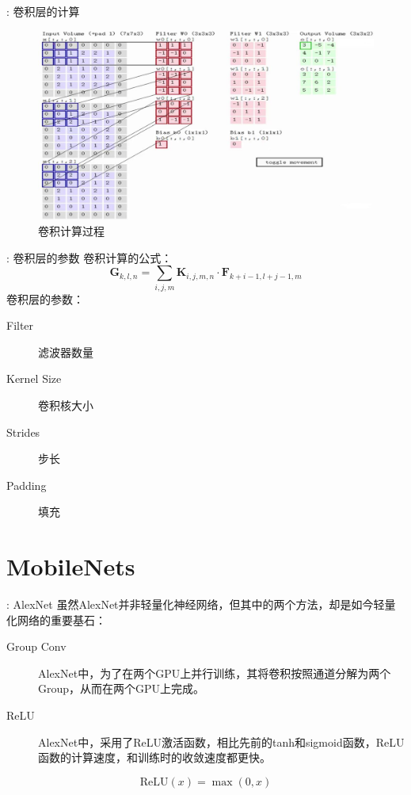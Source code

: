 \documentclass[UTF8, fontset=founder, aspectratio=43, 10pt, t]{ctexbeamer}
\begin{document}
\begin{frame}{\titleprefix: 卷积层的计算}
	\begin{figure}
		\centering
		\includegraphics[width=\linewidth]{Images/conv_1}
		\caption{卷积计算过程}
		\label{fig:conv1}
	\end{figure}
	
\end{frame}

\begin{frame}{\titleprefix: 卷积层的参数}
	卷积计算的公式：
	\[
	\mathbf{G}_{k, l, n}=\sum_{i, j, m} \mathbf{K}_{i, j, m, n} \cdot \mathbf{F}_{k+i-1, l+j-1, m}
	\]
	卷积层的参数：
	\begin{description}
		\item[Filter] 滤波器数量
		\item[Kernel Size] 卷积核大小
		\item[Strides] 步长
		\item[Padding] 填充
	\end{description}
	
\end{frame}

\section{MobileNets}

\begin{frame}{\titleprefix: AlexNet}
	虽然AlexNet并非轻量化神经网络，但其中的两个方法，却是如今轻量化网络的重要基石：
	\begin{description}
		\item[Group Conv] AlexNet中，为了在两个GPU上并行训练，其将卷积按照通道分解为两个Group，从而在两个GPU上完成。
		\item[ReLU] AlexNet中，采用了ReLU激活函数，相比先前的tanh和sigmoid函数，ReLU函数的计算速度，和训练时的收敛速度都更快。
	\end{description}
	\[
	\text{ReLU}(x)=\max (0, x)
	\]
	
\end{frame}
\end{document}
